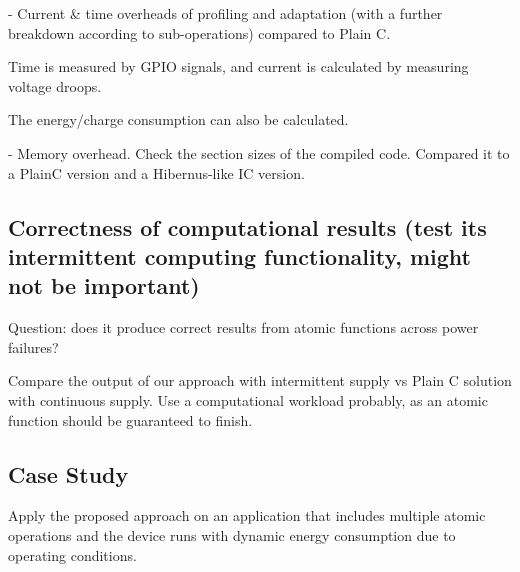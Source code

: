 - Current \& time overheads of profiling and adaptation (with a further breakdown according to sub-operations) compared to Plain C. 

Time is measured by GPIO signals, and current is calculated by measuring voltage droops. 

The energy/charge consumption can also be calculated. 

- Memory overhead. Check the section sizes of the compiled code. Compared it to a PlainC version and a Hibernus-like IC version.  

\subsection{Correctness of computational results (test its intermittent computing functionality, might not be important)}

Question: does it produce correct results from atomic functions across power failures?

Compare the output of our approach with intermittent supply vs Plain C solution with continuous supply. Use a computational workload probably, as an atomic function should be guaranteed to finish. 


\subsection{Case Study}

Apply the proposed approach on an application that includes multiple atomic operations and the device runs with dynamic energy consumption due to operating conditions. 
